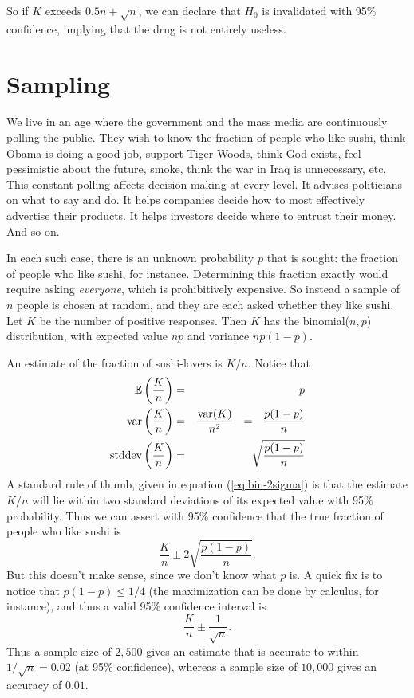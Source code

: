 So if $K$ exceeds $0.5n + \sqrt{n}$, we can declare that $H_0$ is invalidated
with 95\% confidence, implying that the drug is not entirely useless.

\section{Sampling}

We live in an age where the government and the mass media are continuously polling
the public. They wish to know the fraction of people who like sushi, think Obama
is doing a good job, support Tiger Woods, think God exists, feel pessimistic
about the future, smoke, think the war in Iraq is unnecessary, etc. This constant
polling affects decision-making at every level. It advises politicians on what to
say and do. It helps companies decide how to most effectively advertise their
products. It helps investors decide where to entrust their money. And so on.

In each such case, there is an unknown probability $p$ that is sought: the fraction
of people who like sushi, for instance. Determining this fraction exactly would
require asking {\it everyone}, which is prohibitively expensive. So instead a
sample of $n$ people is chosen at random, and they are each asked whether they
like sushi. Let $K$ be the number of positive responses. Then $K$ has the
binomial($n,p$) distribution, with expected value $np$ and variance $np(1-p)$.

An estimate of the fraction of sushi-lovers is $K/n$. Notice that
\begin{eqnarray*}
\E\left(\frac{K}{n}\right) & = & p \\
\var\left(\frac{K}{n} \right) & = & \frac{\var(K)}{n^2} \ \ = \ \ \frac{p(1-p)}{n} \\
\mbox{stddev}\left(\frac{K}{n}\right) & = & \sqrt{\frac{p(1-p)}{n}}
\end{eqnarray*}
A standard rule of thumb, given in equation (\ref{eq:bin-2sigma}) is that the 
estimate $K/n$ will lie within two standard deviations of its expected value 
with 95\% probability. Thus we can assert with 95\% confidence that the true 
fraction of people who like sushi is 
$$ \frac{K}{n} \pm 2 \sqrt{\frac{p(1-p)}{n}} .$$
But this doesn't make sense, since we don't know what $p$ is. A quick fix is
to notice that $p(1-p) \leq 1/4$ (the maximization can be done by calculus,
for instance), and thus a valid 95\% confidence interval is
$$ \frac{K}{n} \pm \frac{1}{\sqrt{n}} .$$
Thus a sample size of $2{,}500$ gives an estimate that is accurate to within
$1/\sqrt{n} = 0.02$ (at 95\% confidence), whereas a sample size of $10{,}000$
gives an accuracy of $0.01$.

